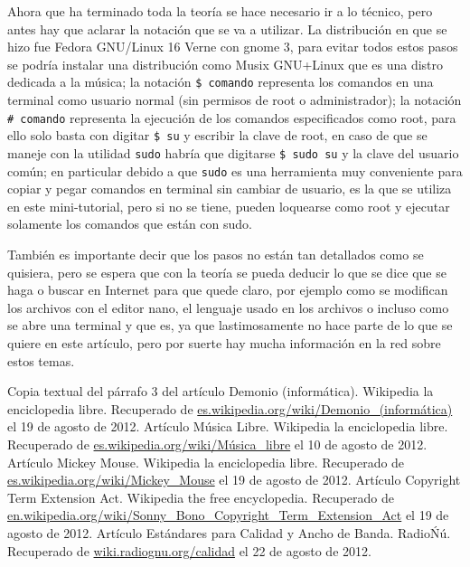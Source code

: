 \begin{multicols}{2}
Ahora que ha terminado toda la teoría se hace necesario ir a lo técnico, pero antes hay que aclarar la notación que se va a utilizar. La distribución en que se hizo fue Fedora GNU/Linux 16 Verne con gnome 3, para evitar todos estos pasos se podría instalar una distribución como Musix GNU+Linux que es una distro dedicada a la música; la notación \verb!$ comando! representa los comandos en una terminal como usuario normal (sin permisos de root o administrador); la notación \verb!# comando! representa la ejecución de los comandos especificados como root, para ello solo basta con digitar \verb!$ su! y escribir la clave de root, en caso de que se maneje con la utilidad \verb!sudo! habría que digitarse \verb!$ sudo su! y la clave del usuario común; en particular debido a que \verb!sudo! es una herramienta muy conveniente para copiar y pegar comandos en terminal sin cambiar de usuario, es la que se utiliza en este mini-tutorial, pero si no se tiene, pueden loquearse como root y ejecutar solamente los comandos que están con sudo.

También es importante decir que los pasos no están tan detallados como se quisiera, pero se espera que con la teoría se pueda deducir lo que se dice que se haga o buscar en Internet para que quede claro, por ejemplo como se modifican los archivos con el editor nano, el lenguaje usado en los archivos o incluso como se abre una terminal y que es, ya que lastimosamente no hace parte de lo que se quiere en este artículo, pero por suerte hay mucha información en la red sobre estos temas.




\begin{bibliografia}
Copia textual del párrafo 3 del artículo Demonio (informática). Wikipedia la enciclopedia libre.
Recuperado de \url{es.wikipedia.org/wiki/Demonio_(informática)} el 19 de agosto de 2012.
Artículo Música Libre. Wikipedia la enciclopedia libre.
Recuperado de \url{es.wikipedia.org/wiki/Música_libre} el 10 de agosto de 2012.
Artículo Mickey Mouse. Wikipedia la enciclopedia libre.
Recuperado de \url{es.wikipedia.org/wiki/Mickey_Mouse} el 19 de agosto de 2012.
Artículo Copyright Term Extension Act. Wikipedia the free encyclopedia.
Recuperado de \url{en.wikipedia.org/wiki/Sonny_Bono_Copyright_Term_Extension_Act} el 19 de agosto de 2012.
Artículo Estándares para Calidad y Ancho de Banda. RadioŃú.
Recuperado de \url{wiki.radiognu.org/calidad} el 22 de agosto de 2012.
\end{bibliografia}



\end{multicols}
